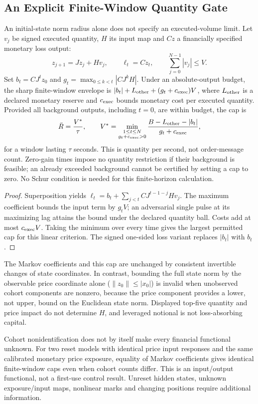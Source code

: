 \documentclass[12pt]{article}
\theoremstyle{definition}
\theoremstyle{remark}
\begin{document}
\subsection{An Explicit Finite-Window Quantity Gate}
An initial-state norm radius alone does not specify an executed-volume limit. Let $v_j$ be signed executed quantity, $H$ its input map and $Cz$ a financially specified monetary loss output:
\[
z_{j+1}=Jz_j+Hv_j,\qquad \ell_t=Cz_t,
\qquad \sum_{j=0}^{N-1}|v_j|\le V.
\]
Set $b_t=CJ^tz_0$ and $g_t=\max_{0\le k<t}|CJ^kH|$. Under an absolute-output budget, the sharp finite-window envelope is $|b_t|+L_{\rm other}+(g_t+c_{\rm exec})V$, where $L_{\rm other}$ is a declared monetary reserve and $c_{\rm exec}$ bounds monetary cost per executed quantity. Provided all background outputs, including $t=0$, are within budget, the cap is
\begin{equation}
\bar R=\frac{V^*}{\tau},\qquad
V^*=\min_{\substack{1\le t\le N\\g_t+c_{\rm exec}>0}}
\frac{B-L_{\rm other}-|b_t|}{g_t+c_{\rm exec}},
\label{eq:rate_gating_rule}
\end{equation}
for a window lasting $\tau$ seconds. This is quantity per second, not order-message count. Zero-gain times impose no quantity restriction if their background is feasible; an already exceeded background cannot be certified by setting a cap to zero. No Schur condition is needed for this finite-horizon calculation.

\begin{proof}
Superposition yields $\ell_t=b_t+\sum_{j<t}CJ^{t-1-j}Hv_j$. The maximum coefficient bounds the input term by $g_tV$; an adversarial single pulse at its maximizing lag attains the bound under the declared quantity ball. Costs add at most $c_{\rm exec}V$. Taking the minimum over every time gives the largest permitted cap for this linear criterion. The signed one-sided loss variant replaces $|b_t|$ with $b_t$.
\end{proof}

The Markov coefficients and this cap are unchanged by consistent invertible changes of state coordinates. In contrast, bounding the full state norm by the observable price coordinate alone ($\|z_0\|\le|x_0|$) is invalid when unobserved cohort components are nonzero, because the price component provides a lower, not upper, bound on the Euclidean state norm. Displayed top-five quantity and price impact do not determine $H$, and leveraged notional is not loss-absorbing capital.

Cohort nonidentification does not by itself make every financial functional unknown. For two reset models with identical price input responses and the same calibrated monetary price exposure, equality of Markov coefficients gives identical finite-window caps even when cohort counts differ. This is an input/output functional, not a first-use control result. Unreset hidden states, unknown exposure/input maps, nonlinear marks and changing positions require additional information.
\end{document}
